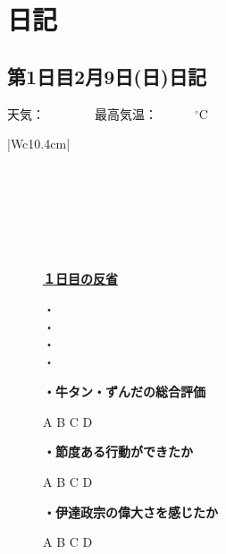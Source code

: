 \section{日記}
\centering
\subsection*{第1日目2月9日(日)日記}
\vspace{0.5cm}
\vspace{0.25cm}

\begin{rightline}
	{\scriptsize{天気：　　　　最高気温：　　　$ {}^\circ $C}}
\end{rightline}
\begin{table}[H]
	\begin{tabular}{|Wc{10.4cm}|} \hline
		\\ \hline
		\\ \hline
		\\ \hline
		\\ \hline
		\\ \hline
		\\ \hline
		\\ \hline
	\end{tabular}
\end{table}
\begin{figure}[H]
	\begin{minipage}[b]{0.45\hsize}
		\begin{boxnote}
			\vspace{-0.2cm}
			\begin{center}
				\underline{\footnotesize{\textbf{１日目の反省}}}
			\end{center}
			\vspace{-0.4cm}
			
			\fontsize{12pt}{25pt}\selectfont
			・\\
			・\\
			・\\
			・
		\end{boxnote}
	\end{minipage}
	\hfill
	\begin{minipage}[b]{0.45\hsize}
		\begin{screen}
			\vspace{0.5cm}
			\scriptsize{\textbf{・牛タン・ずんだの総合評価}}
			\begin{center}
				A \quad B \quad C \quad D
			\end{center}
			\scriptsize{\textbf{・節度ある行動ができたか}}
			\begin{center}
				A \quad B \quad C \quad D
			\end{center}
			\scriptsize{\textbf{・伊達政宗の偉大さを感じたか}}
			\begin{center}
				A \quad B \quad C \quad D
			\end{center}
			\vspace{0.05cm}
		\end{screen}
	\end{minipage}
\end{figure}

